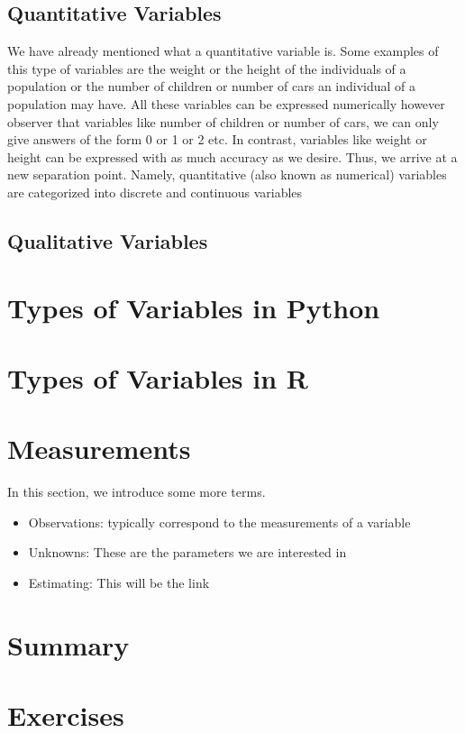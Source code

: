 \subsection{Quantitative Variables}
\label{quantitative_variables}
We have already mentioned what a quantitative variable is. Some examples of this type of variables are the weight or the height of the individuals of a population or the number of children or number of cars an individual of a population may have. All these variables can be expressed numerically however observer that variables like number of children or number of cars, we can only give answers of the form 0 or 1 or 2 etc. In contrast, variables like weight or height can be expressed with as much accuracy as we desire. Thus, we arrive at a new separation point. Namely, quantitative (also known as numerical) variables are categorized into discrete and continuous variables

\subsection{Qualitative Variables}
\label{qualitative_variables}

\section{Types of Variables in Python} 
\label{types_variables_python}

\section{Types of Variables in R}
\label{types_variables_r}


\section{Measurements}
\label{measurements}
In this section, we introduce some more terms.

\begin{itemize}

\item Observations: typically correspond to the measurements of a variable
\item Unknowns: These are the parameters we are interested in
\item Estimating: This will be the link 
\end{itemize}

\section{Summary}

\section{Exercises} 




